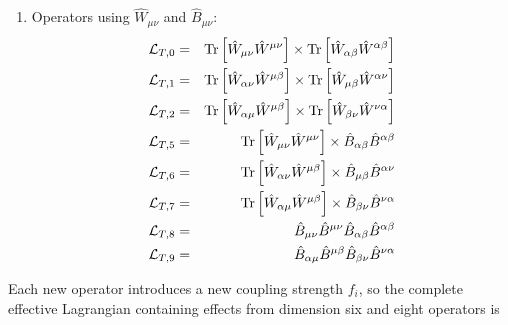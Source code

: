 \documentclass[english,12pt]{article}
\begin{document}
\begin{enumerate}
 \item Operators using $\hat{W}_{\mu \nu}$ and $\hat{B}_{\mu \nu}$:
  \begin{eqnarray}
   {\cal L}_{T,0} &=& \hbox{Tr}\left[ \hat{W}_{\mu\nu} \hat{W}^{\mu\nu} \right] \times 
      \hbox{Tr}\left[ \hat{W}_{\alpha\beta} \hat{W}^{\alpha\beta} \right] \nonumber\\
   {\cal L}_{T,1} &=& \hbox{Tr}\left[ \hat{W}_{\alpha\nu} \hat{W}^{\mu\beta} \right] 
      \times \hbox{Tr}\left[ \hat{W}_{\mu\beta} \hat{W}^{\alpha\nu} \right] \nonumber\\
   {\cal L}_{T,2} &=& \hbox{Tr}\left[ \hat{W}_{\alpha\mu} \hat{W}^{\mu\beta} \right] 
      \times   \hbox{Tr}\left[ \hat{W}_{\beta\nu} \hat{W}^{\nu\alpha} \right] \nonumber\\
   {\cal L}_{T,5} &=& \hbox{Tr}\left[ \hat{W}_{\mu\nu} \hat{W}^{\mu\nu} \right]\times 
      \hat{B}_{\alpha\beta} \hat{B}^{\alpha\beta} \nonumber\\
   {\cal L}_{T,6} &=& \hbox{Tr}\left[ \hat{W}_{\alpha\nu} \hat{W}^{\mu\beta} \right] 
      \times \hat{B}_{\mu\beta} \hat{B}^{\alpha\nu} \nonumber\\
   {\cal L}_{T,7} &=& \hbox{Tr}\left[ \hat{W}_{\alpha\mu} \hat{W}^{\mu\beta} \right] 
      \times \hat{B}_{\beta\nu} \hat{B}^{\nu\alpha} \nonumber\\
   {\cal L}_{T,8} &=& \hat{B}_{\mu\nu} \hat{B}^{\mu\nu}  \hat{B}_{\alpha\beta} \hat{B}^{\alpha\beta} \nonumber\\
   {\cal L}_{T,9} &=& \hat{B}_{\alpha\mu} \hat{B}^{\mu\beta} \hat{B}_{\beta\nu} \hat{B}^{\nu\alpha}
  \end{eqnarray}
\end{enumerate}

\newpage
\noindent
Each new operator introduces a new coupling strength $f_i$, so the complete effective Lagrangian
containing effects from dimension six and eight operators is
\end{document}
